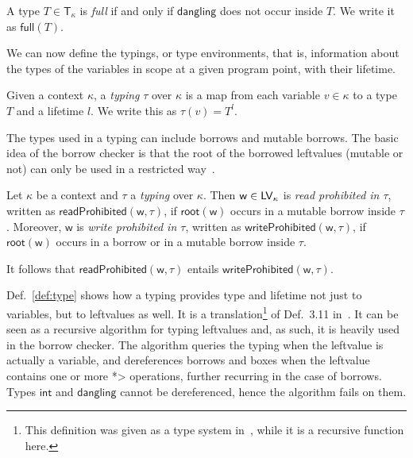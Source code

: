 \begin{definition}\label{def:full}
  A type $T\in\mathsf{T}_\kappa$ is \emph{full}
  if and only if $\mathsf{dangling}$ does not occur inside $T$.
  We write it as $\mathsf{full}(T)$.
\end{definition}

We can now define the typings, or type environments, that is,
information about the types of the variables in scope at a given program point,
with their lifetime.

\begin{definition}[Typing]\label{def:typing}
  Given a context $\kappa$, a \emph{typing} $\tau$ over $\kappa$ is
  a map from each variable $v\in\kappa$ to a type $T$ and a lifetime $l$.
  We write this as $\tau(v)=T^l$.
\end{definition}

The types used in a typing can include borrows and mutable borrows.
The basic idea of the borrow checker is that the root of the
borrowed leftvalues (mutable or not) can only be used
in a restricted way~\cite{Pea21}.

\begin{definition}\label{def:prohibited}
  Let $\kappa$ be a context and $\tau$ a \emph{typing} over $\kappa$.
  Then $\mathsf{w}\in\mathsf{LV}_\kappa$ is
  \emph{read prohibited in $\tau$},
  written as $\mathsf{readProhibited}(\mathsf{w},\tau)$,
  if $\mathsf{root}(\mathsf{w})$ occurs in a mutable borrow inside $\tau$.
  Moreover, $\mathsf{w}$ is \emph{write prohibited in $\tau$}, written
  as $\mathsf{writeProhibited}(\mathsf{w},\tau)$,
  if $\mathsf{root}(\mathsf{w})$ occurs in a borrow or in a
  mutable borrow inside $\tau$.
\end{definition}

\noindent
It follows that $\mathsf{readProhibited}(\mathsf{w},\tau)$ entails
$\mathsf{writeProhibited}(\mathsf{w},\tau)$.

Def.~\ref{def:type} shows how a typing provides type and lifetime not just to variables,
but to leftvalues as well.
It is a translation\footnote{This definition was given as a type system in~\cite{Pea21}, while it is a recursive function here.} of
Def.~3.11 in~\cite{Pea21}.
It can be seen as a recursive algorithm for typing leftvalues
and, as such, it is heavily used in the borrow checker.
The algorithm queries the typing when the leftvalue is actually a variable,
and dereferences borrows and boxes when the leftvalue contains one or more
\<*> operations, further recurring in the case of borrows.
Types $\mathsf{int}$ and $\mathsf{dangling}$ cannot be dereferenced, hence the
algorithm fails on them.

